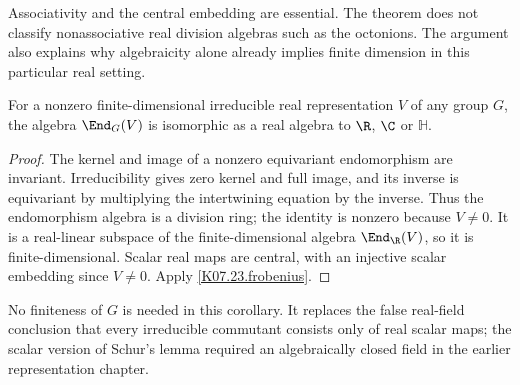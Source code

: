 Associativity and the central embedding are essential. The theorem does
not classify nonassociative real division algebras such as the octonions.
The argument also explains why algebraicity alone already implies finite
dimension in this particular real setting.

\begin{corollary}
For a nonzero finite-dimensional irreducible real representation $V$ of
any group $G$, the algebra $\End_G(V)$ is isomorphic as a real algebra
to $\R$, $\C$ or $\mathbb H$.
\end{corollary}
\begin{proof}
The kernel and image of a nonzero equivariant endomorphism are invariant.
Irreducibility gives zero kernel and full image, and its inverse is
equivariant by multiplying the intertwining equation by the inverse.
Thus the endomorphism algebra is a division ring; the identity is nonzero
because $V\ne0$. It is a real-linear subspace of the finite-dimensional
algebra $\End_\R(V)$, so it is finite-dimensional. Scalar real maps
are central, with an injective scalar embedding since $V\ne0$.
Apply \ref{K07.23.frobenius}.
\end{proof}
No finiteness of $G$ is needed in this corollary. It replaces the false
real-field conclusion that every irreducible commutant consists only of
real scalar maps; the scalar version of Schur's lemma required an
algebraically closed field in the earlier representation chapter.
